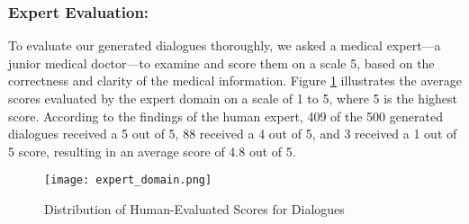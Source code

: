 \documentclass[manuscript,screen,review]{acmart}
\begin{document}
\subsubsection{Expert Evaluation:}
To evaluate our generated dialogues thoroughly, we asked a medical expert—a junior medical doctor—to examine and score them on a scale 5, based on the correctness and clarity of the medical information. 
Figure \ref{fig:expert_domain} illustrates the average scores evaluated by the expert domain on a
scale of 1 to 5, where 5 is the highest score. 
According to the findings of the human expert, 409 of the 500 generated dialogues received a 5 out of 5, 88 received a 4 out of 5, and 3 received a 1 out of 5 score, resulting in an average score of 4.8 out of 5.

\begin{figure}[htbp]
    \centering
    \texttt{[image: expert\_domain.png]} 
    \caption{Distribution of Human-Evaluated Scores for Dialogues}
    \label{fig:expert_domain}
\end{figure}
\end{document}
